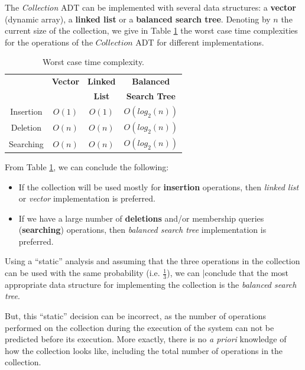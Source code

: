 The \emph{Collection} ADT can be implemented with several data structures: a \textbf{vector} (dynamic array), a \textbf{linked list} or a \textbf{balanced search tree}. Denoting by $n$ the current size of the collection, we give in Table \ref{collection} the worst case time complexities for the operations of the $Collection$ ADT  for different implementations.  

\begin{table}[t]
\centering
\begin{tabular}{|c|c|c|c|}
\hline
&\textbf{Vector}&\textbf{Linked}&\textbf{Balanced}\\
&&\textbf{List}&\textbf{Search Tree}\\
\hline
Insertion& $O(1)$& $O(1)$ & $O(log_2(n))$\\
Deletion&$O(n)$& $O(n)$ & $O(log_2(n))$\\
Searching&$O(n)$& $O(n)$ & $O(log_2(n))$\\
\hline
\end{tabular}
\caption{Worst case time complexity.}
\label{collection}
\end{table}

From Table \ref{collection}, we can conclude the following:

\begin{itemize}

\item If the collection will be used mostly for \textbf{insertion} operations, then  \emph{linked list} or \emph{vector} implementation is preferred. 

\item If we have a large number of \textbf{deletions} and/or membership queries (\textbf{searching}) operations, then  \emph{balanced search tree} implementation is preferred.

\end{itemize}

Using a ``static'' analysis and assuming that the three operations in the collection can be used with the same probability (i.e. $\frac{1}{3}$), we can |conclude that the most appropriate data structure for implementing the collection is the \emph{balanced search tree}.

But, this ``static'' decision can be incorrect, as the number of operations performed on the collection during the execution of the system can not be predicted before its execution. More exactly, there is no \emph{a priori} knowledge of how the collection looks like, including the total number of operations in the collection.

